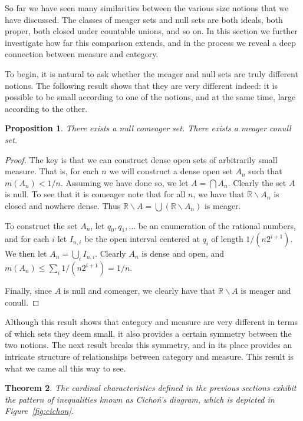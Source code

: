 \documentclass[11pt,oneside]{amsbook}
\newcommand{\R}{\mathbb R}
\theoremstyle{definition}
\theoremstyle{plain}
\newtheorem{theorem}{Theorem}[section]
\newtheorem{proposition}[theorem]{Proposition}
\theoremstyle{definition}
\theoremstyle{remark}
\numberwithin{equation}{section}
\numberwithin{figure}{section}
\begin{document}
So far we have seen many similarities between the various size notions that we have discussed. The classes of meager sets and null sets are both ideals, both proper, both closed under countable unions, and so on. In this section we further investigate how far this comparison extends, and in the process we reveal a deep connection between measure and category.

To begin, it is natural to ask whether the meager and null sets are truly different notions. The following result shows that they are very different indeed: it is possible to be small according to one of the notions, and at the same time, large according to the other.

\begin{proposition}
  \label{prop:null-comeager}
  There exists a null comeager set. There exists a meager conull set.  \end{proposition}

\begin{proof}
  The key is that we can construct dense open sets of arbitrarily small measure. That is, for each $n$ we will construct a dense open set $A_n$ such that $m(A_n)<1/n$. Assuming we have done so, we let $A=\bigcap A_n$. Clearly the set $A$ is null. To see that it is comeager note that for all $n$, we have that $\R\smallsetminus A_n$ is closed and nowhere dense. Thus $\R\smallsetminus A=\bigcup(\R\smallsetminus A_n)$ is meager.

  To construct the set $A_n$, let $q_0,q_1,\ldots$ be an enumeration of the rational numbers, and for each $i$ let $I_{n,i}$ be the open interval centered at $q_i$ of length $1/(n2^{i+1})$. We then let $A_n=\bigcup_iI_{n,i}$. Clearly $A_n$ is dense and open, and $m(A_n)\leq\sum_i1/(n2^{i+1})=1/n$.

  Finally, since $A$ is null and comeager, we clearly have that $\R\smallsetminus A$ is meager and conull.
\end{proof}

Although this result shows that category and measure are very different in terms of which sets they deem small, it also provides a certain symmetry between the two notions. The next result breaks this symmetry, and in its place provides an intricate structure of relationships between category and measure. This result is what we came all this way to see.

\begin{theorem}
  \label{thm:cichon}
  The cardinal characteristics defined in the previous sections exhibit the pattern of inequalities known as \emph{Cicho\'n's diagram}, which is depicted in Figure~\ref{fig:cichon}.
\end{theorem}
\end{document}
